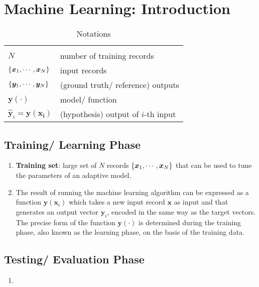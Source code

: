 \chapter{Machine Learning: Introduction}

\begin{customArrayStretch}{1.5}
\begin{longtable}{l p{7cm}}

\hline\endfirsthead
\hline\endhead
\hline\endfoot
\hline
\caption*{Notations} \\
\endlastfoot

$N$ & number of training records\\ \hline

$\left\{\bm{x}_1, \cdots , \bm{x}_N \right\}$ & input records \\ \hline

$\left\{\bm{y}_1, \cdots , \bm{y}_N \right\}$ & (ground truth/ reference) outputs \\ \hline

$\bm{y}(\cdot)$ & model/ function \\ \hline

$\hat{\bm{y}}_i = \bm{y}(\bm{x_i})$ & (hypothesis) output of $i$-th input \\



\end{longtable}
\end{customArrayStretch}





\section{Training/ Learning Phase}

\begin{enumerate}
    \item \textbf{Training set}: large set of $N$ records $\left\{\bm{x}_1, \cdots , \bm{x}_N \right\}$ that can be used to tune the parameters of an adaptive model. 
    \hfill \cite{ml/book/Pattern-Recognition-And-Machine-Learning/Christopher-M-Bishop}

    \item The result of running the machine learning algorithm can be expressed as a function $\bm{y}(\bm{x}_i)$ which takes a new input record $\bm{x}$ as input and that generates an output vector $\bm{y}_i$, encoded in the same way as the target vectors.
    The precise form of the function $\bm{y}(\cdot)$ is determined during the training phase, also known as the learning phase, on the basis of the training data.
    \hfill \cite{ml/book/Pattern-Recognition-And-Machine-Learning/Christopher-M-Bishop}
\end{enumerate}



\section{Testing/ Evaluation Phase}

\begin{enumerate}
    \item 
\end{enumerate}










